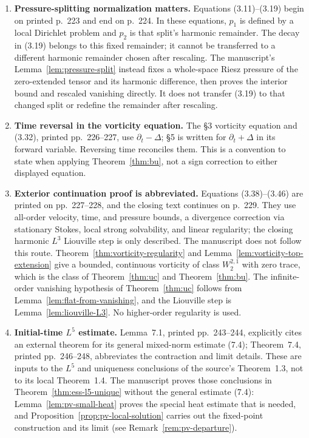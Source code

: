 \documentclass[11pt,letterpaper]{article}
\numberwithin{equation}{section}
\theoremstyle{plain}
\theoremstyle{definition}
\theoremstyle{remark}
\begin{document}
\begin{enumerate}
\item \textbf{Pressure-splitting normalization matters.} Equations (3.11)--(3.19) begin on printed p.~223 and end on p.~224. In these equations, \(p_1\) is defined by a local Dirichlet problem and \(p_2\) is that split's harmonic remainder. The decay in (3.19) belongs to this fixed remainder; it cannot be transferred to a different harmonic remainder chosen after rescaling. The manuscript's Lemma~\ref{lem:pressure-split} instead fixes a whole-space Riesz pressure of the zero-extended tensor and its harmonic difference, then proves the interior bound and rescaled vanishing directly. It does not transfer (3.19) to that changed split or redefine the remainder after rescaling.

\item \textbf{Time reversal in the vorticity equation.} The §3 vorticity equation and (3.32), printed pp.~226--227, use \(\partial_t-\Delta\); §5 is written for \(\partial_t+\Delta\) in its forward variable. Reversing time reconciles them. This is a convention to state when applying Theorem~\ref{thm:bu}, not a sign correction to either displayed equation.

\item \textbf{Exterior continuation proof is abbreviated.} Equations (3.38)--(3.46) are printed on pp.~227--228, and the closing text continues on p.~229. They use all-order velocity, time, and pressure bounds, a divergence correction via stationary Stokes, local strong solvability, and linear regularity; the closing harmonic \(L^3\) Liouville step is only described. The manuscript does not follow this route. Theorem~\ref{thm:vorticity-regularity} and Lemma~\ref{lem:vorticity-top-extension} give a bounded, continuous vorticity of class \(W^{2,1}_2\) with zero trace, which is the class of Theorem~\ref{thm:uc} and Theorem~\ref{thm:bu}. The infinite-order vanishing hypothesis of Theorem~\ref{thm:uc} follows from Lemma~\ref{lem:flat-from-vanishing}, and the Liouville step is Lemma~\ref{lem:liouville-L3}. No higher-order regularity is used.

\item \textbf{Initial-time \(L^5\) estimate.} Lemma~7.1, printed pp.~243--244, explicitly cites an external theorem for its general mixed-norm estimate (7.4); Theorem~7.4, printed pp.~246--248, abbreviates the contraction and limit details. These are inputs to the \(L^5\) and uniqueness conclusions of the source's Theorem~1.3, not to its local Theorem~1.4. The manuscript proves those conclusions in Theorem~\ref{thm:ess-l5-unique} without the general estimate (7.4): Lemma~\ref{lem:pv-small-heat} proves the special heat estimate that is needed, and Proposition~\ref{prop:pv-local-solution} carries out the fixed-point construction and its limit (see Remark~\ref{rem:pv-departure}).


\end{enumerate}
\end{document}
